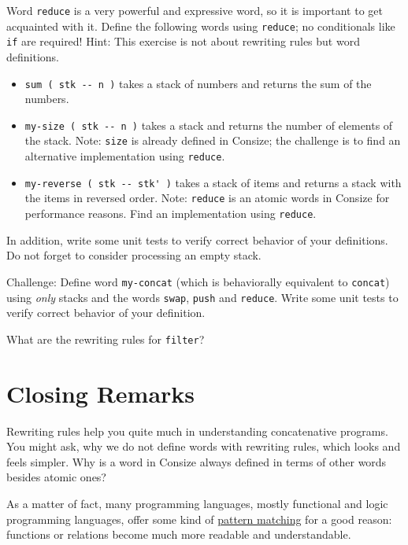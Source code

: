 \begin{exercise}\label{ex:reduce.examples}
Word \verb|reduce| is a very powerful and expressive word, so it is important to get acquainted with it. Define the following words using \verb|reduce|; no conditionals like \verb|if| are required! Hint: This exercise is not about rewriting rules but word definitions.
\begin{itemize}
\item \verb|sum ( stk -- n )| takes a stack of numbers and returns the sum of the numbers.
\item \verb|my-size ( stk -- n )| takes a stack and returns the number of elements of the stack. Note: \verb|size| is already defined in Consize; the challenge is to find an alternative implementation using \verb|reduce|.
\item \verb|my-reverse ( stk -- stk' )| takes a stack of items and returns a stack with the items in reversed order. Note: \verb|reduce| is an atomic words in Consize for performance reasons. Find an implementation using \verb|reduce|.
\end{itemize}
In addition, write some unit tests to verify correct behavior of your definitions. Do not forget to consider processing an empty stack.
\end{exercise}

\begin{exercise}\label{ex:concat.reduce}
Challenge: Define word \verb|my-concat| (which is behaviorally equivalent to \verb|concat|) using \emph{only} stacks and the words \verb|swap|, \verb|push| and \verb|reduce|. Write some unit tests to verify correct behavior of your definition.
\end{exercise}

\begin{exercise}\label{ex:filter}
What are the rewriting rules for \verb|filter|?
\end{exercise}

\section{Closing Remarks}

Rewriting rules help you quite much in understanding concatenative programs. You might ask, why we do not define words with rewriting rules, which looks and feels simpler. Why is a word in Consize always defined in terms of other words besides atomic ones?

As a matter of fact, many programming languages, mostly functional and logic programming languages, offer some kind of \href{http://en.wikipedia.org/wiki/Pattern_matching}{pattern matching} for a good reason: functions or relations become much more readable and understandable.

